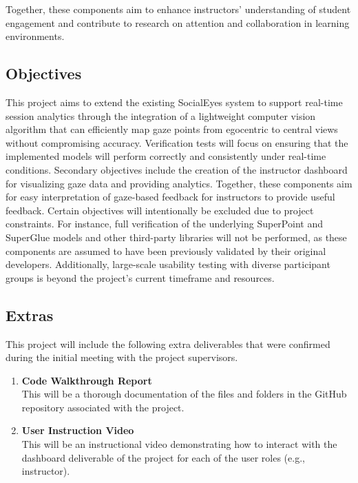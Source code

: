\documentclass[12pt, titlepage]{article}
\begin{document}
Together, these components aim to enhance instructors’ understanding of student engagement and contribute to research on attention and collaboration in learning environments.


\subsection{Objectives}

This project aims to extend the existing SocialEyes system to support real-time session analytics through the integration of a lightweight computer vision algorithm that can efficiently map gaze points from egocentric to central views without compromising accuracy. Verification tests will focus on ensuring that the implemented models will perform correctly and consistently under real-time conditions.
\newline
\newline
Secondary objectives include the creation of the instructor dashboard for visualizing gaze data and providing analytics. Together, these components aim for easy interpretation of gaze-based feedback for instructors to provide useful feedback.
\newline
\newline
Certain objectives will intentionally be excluded due to project constraints. For instance, full verification of the underlying SuperPoint and SuperGlue models and other third-party libraries will not be performed, as these components are assumed to have been previously validated by their original developers. Additionally, large-scale usability testing with diverse participant groups is beyond the project’s current timeframe and resources. 


\subsection{Extras}

This project will include the following extra deliverables that were confirmed during the initial meeting with the project supervisors.

\begin{enumerate}
    \item \textbf{Code Walkthrough Report} \\
    This will be a thorough documentation of the files and folders in the GitHub repository associated with the project.
    
    \item \textbf{User Instruction Video} \\
    This will be an instructional video demonstrating how to interact with the dashboard deliverable of the project for each of the user roles (e.g., instructor).
\end{enumerate}
\end{document}
